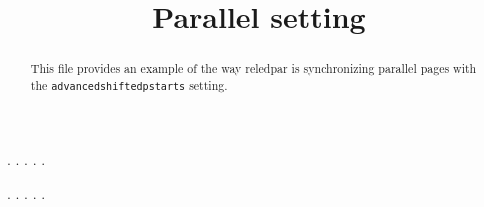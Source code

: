 \documentclass[a5paper,12pt]{article}
\begin{document}
\large

\date{}
\title{Parallel setting}
\maketitle

\begin{abstract}
This file provides an example of the way reledpar is synchronizing parallel pages with the \verb+advancedshiftedpstarts+ setting.
\end{abstract}


\begin{pages}
    \begin{Leftside}
        \beginnumbering
            . \blindtext[21]
            \pend{}. \blindtext[10]
            \pend{}. \blindtext[6]
            \pend{}. \blindtext[6]
            \pend
            . \blindtext[6]
            \pend
        \endnumbering
    \end{Leftside}
    \begin{Rightside}
        \beginnumbering
            . \blindtext[22]\footnoteAmk
            \pend{}. \blindtext[12]
            \pend{}. \blindtext[12]
            \pend
            . \blindtext[12]
            \pend
            . \blindtext[12]
            \pend
        \endnumbering
    \end{Rightside}
\end{pages}
\Pages
\end{document}
